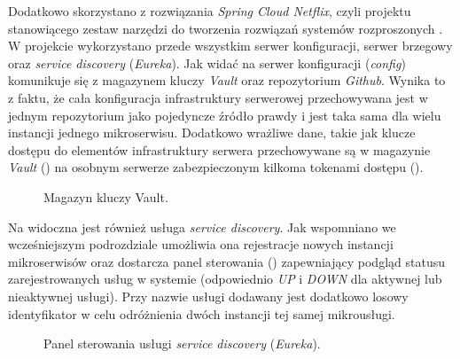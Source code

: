 Dodatkowo skorzystano z rozwiązania \textit{Spring Cloud Netflix}, czyli projektu stanowiącego zestaw narzędzi do
tworzenia rozwiązań systemów rozproszonych \cite{bib:spring-cloud-netflix}. W projekcie wykorzystano przede wszystkim
serwer konfiguracji, serwer brzegowy oraz \textit{service discovery} (\textit{Eureka}). Jak widać na
 serwer konfiguracji (\textit{config}) komunikuje się z magazynem kluczy \textit{Vault} oraz
repozytorium \textit{Github}. Wynika to z faktu, że cała konfiguracja infrastruktury serwerowej przechowywana jest w
jednym repozytorium jako pojedyncze źródło prawdy i jest taka sama dla wielu instancji jednego mikroserwisu. Dodatkowo
wrażliwe dane, takie jak klucze dostępu do elementów infrastruktury serwera przechowywane są w magazynie \textit{Vault}
() na osobnym serwerze zabezpieczonym kilkoma tokenami dostępu ().
%
\begin{figure}[H]
  \centering
  \caption{Magazyn kluczy Vault.}
  \label{fig:vault}
\end{figure}

Na  widoczna jest również usługa \textit{service discovery}. Jak wspomniano we wcześniejszym
podrozdziale umożliwia ona rejestracje nowych instancji mikroserwisów oraz dostarcza panel sterowania
() zapewniający podgląd statusu zarejestrowanych usług w systemie (odpowiednio \textit{UP} i
\textit{DOWN} dla aktywnej lub nieaktywnej usługi). Przy nazwie usługi dodawany jest dodatkowo losowy identyfikator w
celu odróżnienia dwóch instancji tej samej mikrousługi.
%
\begin{figure}[H]
  \centering
  \caption{Panel sterowania usługi \textit{service discovery} (\textit{Eureka}).}
  \label{fig:spring-eureka}
\end{figure}



